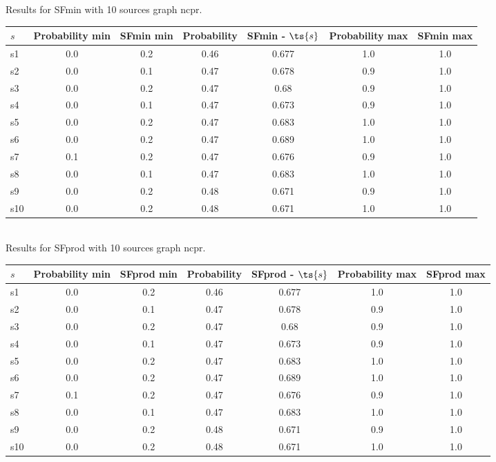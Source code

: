 \documentclass{article}
\begin{document}
\noindent Results for SFmin with 10 sources graph ncpr.

\noindent\begin{tabular}{|l|c|c|c|c|c|c|}
\hline
$s$& Probability min & SFmin min & Probability & SFmin - $\ts{s}$ & Probability max & SFmin max\\
\hline
s1 &0.0 & 0.2 & 0.46 & 0.677 & 1.0 & 1.0\\
\hline
s2 &0.0 & 0.1 & 0.47 & 0.678 & 0.9 & 1.0\\
\hline
s3 &0.0 & 0.2 & 0.47 & 0.68 & 0.9 & 1.0\\
\hline
s4 &0.0 & 0.1 & 0.47 & 0.673 & 0.9 & 1.0\\
\hline
s5 &0.0 & 0.2 & 0.47 & 0.683 & 1.0 & 1.0\\
\hline
s6 &0.0 & 0.2 & 0.47 & 0.689 & 1.0 & 1.0\\
\hline
s7 &0.1 & 0.2 & 0.47 & 0.676 & 0.9 & 1.0\\
\hline
s8 &0.0 & 0.1 & 0.47 & 0.683 & 1.0 & 1.0\\
\hline
s9 &0.0 & 0.2 & 0.48 & 0.671 & 0.9 & 1.0\\
\hline
s10 &0.0 & 0.2 & 0.48 & 0.671 & 1.0 & 1.0\\
\hline
\end{tabular}\\

\noindent Results for SFprod with 10 sources graph ncpr.

\noindent\begin{tabular}{|l|c|c|c|c|c|c|}
\hline
$s$& Probability min & SFprod min & Probability & SFprod - $\ts{s}$ & Probability max & SFprod max\\
\hline
s1 &0.0 & 0.2 & 0.46 & 0.677 & 1.0 & 1.0\\
\hline
s2 &0.0 & 0.1 & 0.47 & 0.678 & 0.9 & 1.0\\
\hline
s3 &0.0 & 0.2 & 0.47 & 0.68 & 0.9 & 1.0\\
\hline
s4 &0.0 & 0.1 & 0.47 & 0.673 & 0.9 & 1.0\\
\hline
s5 &0.0 & 0.2 & 0.47 & 0.683 & 1.0 & 1.0\\
\hline
s6 &0.0 & 0.2 & 0.47 & 0.689 & 1.0 & 1.0\\
\hline
s7 &0.1 & 0.2 & 0.47 & 0.676 & 0.9 & 1.0\\
\hline
s8 &0.0 & 0.1 & 0.47 & 0.683 & 1.0 & 1.0\\
\hline
s9 &0.0 & 0.2 & 0.48 & 0.671 & 0.9 & 1.0\\
\hline
s10 &0.0 & 0.2 & 0.48 & 0.671 & 1.0 & 1.0\\
\hline
\end{tabular}\\
\end{document}

